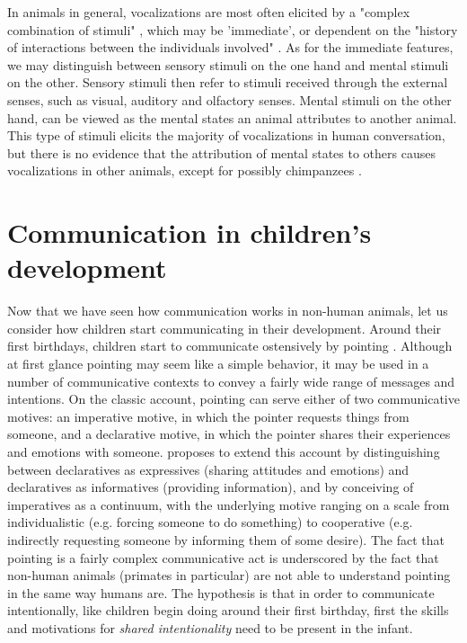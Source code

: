 In animals in general, vocalizations are most often elicited by a "complex combination of stimuli" \citep[p.~150]{SeyfarthCheney03}, which may be 'immediate', or dependent on the "history of interactions between the individuals involved" \citep[p.~151]{SeyfarthCheney03}. As for the immediate features, we may distinguish between sensory stimuli on the one hand and mental stimuli on the other. Sensory stimuli then refer to stimuli received through the external senses, such as visual, auditory and olfactory senses. Mental stimuli on the other hand, can be viewed as the mental states an animal attributes to another animal. This type of stimuli elicits the majority of vocalizations in human conversation, but there is no evidence that the attribution of mental states to others causes vocalizations in other animals, except for possibly chimpanzees \citep{SeyfarthCheney03}.

\section{Communication in children's development}
\label{sec:comm:ontogeny}

Now that we have seen how communication works in non-human animals, let us consider how children start communicating in their development.
Around their first birthdays, children start to communicate ostensively by pointing \citep{Tomasello08-origins}. Although at first glance pointing may seem like a simple behavior, it may be used in a number of communicative contexts to convey a fairly wide range of messages and intentions. 
On the classic account, pointing can serve either of two communicative motives: an imperative motive, in which the pointer requests things from someone, and a declarative motive, in which the pointer shares their experiences and emotions with someone. 
\citet{Tomasello08-origins} proposes to extend this account by distinguishing between declaratives as expressives (sharing attitudes and emotions) and declaratives as informatives (providing information), and by conceiving of imperatives as a continuum, with the underlying motive ranging on a scale from individualistic (e.g. forcing someone to do something) to cooperative (e.g. indirectly requesting someone by informing them of some desire). 
The fact that pointing is a fairly complex communicative act is underscored by the fact that non-human animals (primates in particular) are not able to understand pointing in the same way humans are. 
The hypothesis is that in order to communicate intentionally, like children begin doing around their first birthday, first the skills and motivations for \emph{shared intentionality} need to be present in the infant.

